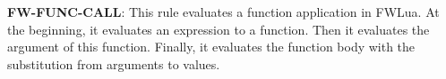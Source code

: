 
{\bf FW-FUNC-CALL}: This rule evaluates a function application in FWLua. At the beginning, it evaluates an expression to a function. Then it evaluates the argument of this function.  Finally, it evaluates the function body with the substitution from arguments to values. 


\newcommand{\metaSemanticFull}[6]{{#1}, {#2}, {#3} \Downarrow {#4}, {#5}, {#6}}
\newcommand{\ssrule}[3]{
  \rel{#1} &
  \frac{\strut\begin{array}{@{}c@{}} #2 \end{array}}
       {\strut\begin{array}{@{}c@{}} #3 \end{array}}
   \\~\\
}
